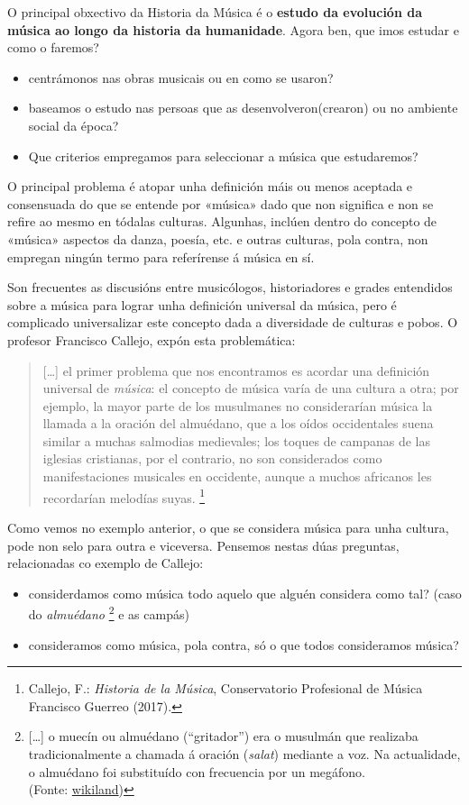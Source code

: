 \documentclass[a4paper, twoside]{templates/ociamthesis}
\providecommand{\tightlist}{%
  \setlength{\itemsep}{0pt}\setlength{\parskip}{0pt}}
\begin{document}
O principal obxectivo da Historia da Música é o \textbf{estudo da evolución da música ao longo da historia da humanidade}. Agora ben, que imos estudar e como o faremos?

\begin{itemize}
\tightlist
\item
  centrámonos nas obras musicais ou en como se usaron?
\item
  baseamos o estudo nas persoas que as desenvolveron(crearon) ou no ambiente social da época?
\item
  Que criterios empregamos para seleccionar a música que estudaremos?
\end{itemize}

O principal problema é atopar unha definición máis ou menos aceptada e consensuada do que se entende por «música» dado que non significa e non se refire ao mesmo en tódalas culturas. Algunhas, inclúen dentro do concepto de «música» aspectos da danza, poesía, etc. e outras culturas, pola contra, non empregan ningún termo para referírense á música en sí.

Son frecuentes as discusións entre musicólogos, historiadores e grades entendidos sobre a música para lograr unha definición universal da música, pero é complicado universalizar este concepto dada a diversidade de culturas e pobos. O profesor Francisco Callejo, expón esta problemática:

\begin{quote}
{[}\ldots{]} el primer problema que nos encontramos es acordar una definición universal de \emph{música}: el concepto de música varía de una cultura a otra; por ejemplo, la mayor parte de los musulmanes no considerarían música la llamada a la oración del almuédano, que a los oídos occidentales suena similar a muchas salmodias medievales; los toques de campanas de las iglesias cristianas, por el contrario, no son considerados como manifestaciones musicales en occidente, aunque a muchos africanos les recordarían melodías suyas. \footnote{Callejo, F.: \emph{Historia de la Música}, Conservatorio Profesional de Música Francisco Guerreo (2017).}
\end{quote}

Como vemos no exemplo anterior, o que se considera música para unha cultura, pode non selo para outra e viceversa. Pensemos nestas dúas preguntas, relacionadas co exemplo de Callejo:

\begin{itemize}
\tightlist
\item
  considerdamos como música todo aquelo que alguén considera como tal? (caso do \emph{almuédano} \footnote{{[}\ldots{]} o muecín ou almuédano (``gritador'') era o musulmán que realizaba tradicionalmente a chamada á oración (\emph{salat}) mediante a voz. Na actualidade, o almuédano foi substituído con frecuencia por un megáfono.\\
    (Fonte:
    \href{https://www.wikiwand.com/gl/Minarete?wprov=srpw1_0}{wikiland})} e as campás)
\item
  consideramos como música, pola contra, só o que todos consideramos música?
\end{itemize}
\end{document}
